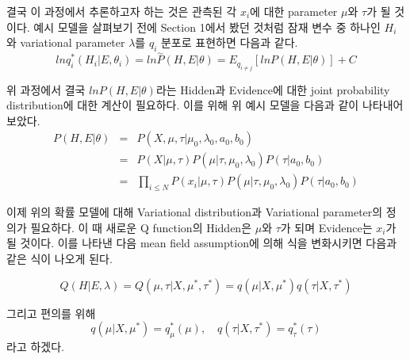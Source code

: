 \documentclass[draft=false]{oblivoir}
\begin{document}
결국 이 과정에서 추론하고자 하는 것은 관측된 각 $x_{i}$에 대한 parameter $\mu$와 $\tau$가 될 것이다. 예시 모델을 살펴보기 전에 Section 1에서 봤던 것처럼 잠재 변수 중 하나인 $H_{i}$와 variational parameter $\lambda$를 $q_{i}$ 분포로 표현하면 다음과 같다.
\begin{equation}
lnq_{i}^{*}(H_{i}|E,\theta_{i}) = ln \overset{\sim}{P}(H,E|\theta)=E_{q_{i \neq j}}[lnP(H,E|\theta)] + C
\label{eq:11-2-4}
\end{equation}

위 과정에서 결국 $ lnP(H,E|\theta)$라는 Hidden과 Evidence에 대한 joint probability distribution에 대한 계산이 필요하다. 이를 위해 위 예시 모델을 다음과 같이 나타내어 보았다. 
\begin{eqnarray}
P(H,E|\theta)\nonumber & = & P(X,\mu,\tau|\mu_{0},\lambda_{0},a_{0},b_{0})\nonumber\\
& = & P(X|\mu,\tau)P(\mu|\tau,\mu_{0},\lambda_{0})P(\tau|a_{0},b_{0})\nonumber\\
& = & 	\prod_{i\leq N}{P(x_{i}|\mu,\tau) P(\mu|\tau,\mu_{0},\lambda_{0})P(\tau|a_{0},b_{0})}
\label{eq:11-2-5-2}
\end{eqnarray}

이제 위의 확률 모델에 대해 Variational distribution과 Variational parameter의 정의가 필요하다. 이 때 새로운 Q function의 Hidden은 $\mu$와 $\tau$가 되며 Evidence는 $x_{i}$가 될 것이다. 이를 나타낸 다음 mean field assumption에 의해 식을 변화시키면 다음과 같은 식이 나오게 된다. 

\begin{equation}
Q(H|E, \lambda) = Q(\mu, \tau | X,\mu^{*},\tau^{*})=q(\mu |X,\mu^{*})q(\tau|X,\tau^{*})
\label{eq:11-2-6}
\end{equation}

그리고 편의를 위해
\begin{equation}
q(\mu |X,\mu^{*}) = q_{\mu}^{*}(\mu), \quad q(\tau|X,\tau^{*}) = q_{\tau}^{*}(\tau)
\label{eq:11-2-7}
\end{equation}
라고 하겠다.

\end{document}
